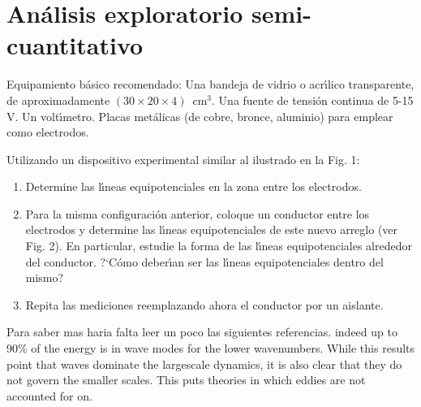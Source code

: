 \documentclass[laboratorio]{guia}
\begin{document}
\section{An\'alisis exploratorio semi-cuantitativo}

Equipamiento b\'asico recomendado: Una bandeja de vidrio o acr\'\i lico transparente, de aproximadamente $(30 \times 20 \times 4)$~cm$^3$. Una fuente de tensi\'on continua de 5-15 V. Un volt\'\i metro. Placas met\'alicas (de cobre, bronce, aluminio) para emplear como electrodos.

Utilizando un dispositivo experimental similar al ilustrado en la Fig. 1: 

\begin{enumerate}
    \item Determine las l\'\i neas equipotenciales en la zona entre los electrodos.
    \item Para la misma configuraci\'on anterior, coloque un conductor entre los electrodos y determine las l\'\i neas equipotenciales de este nuevo arreglo (ver Fig. 2). En particular, estudie la forma de las  l\'\i neas equipotenciales alrededor del conductor. ?`C\'omo deber\'\i an ser las l\'\i neas equipotenciales dentro del mismo?  
    \item Repita las mediciones reemplazando ahora el conductor por un aislante. 
\end{enumerate}

\begin{sabermas} Para saber mas haria falta leer un poco las siguientes
    referencias.  indeed up to 90\% of the energy is in wave modes for the
    lower wavenumbers. While this results point that waves dominate the
    largescale dynamics, it is also clear that they do not govern the smaller
    scales.  This puts theories in which eddies are not accounted for on.
\end{sabermas}

%  
\end{document}

